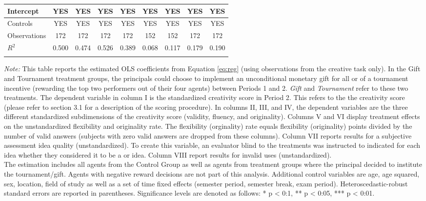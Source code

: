 \begin{landscape}
\begin{table}[h]
\begin{center}
{\begin{tabular}{lcccccccc}
\hline
 Intercept & YES & YES & YES & YES & YES & YES & YES & YES \\
\hline
 Controls & YES & YES & YES & YES & YES & YES & YES & YES \\
\hline
Observations        &         172   &         172   &         172   &         172   &         152   &         152   &         172   &         172   \\
$R^2$               &       0.500   &       0.474   &       0.526   &       0.389   &       0.068   &       0.117   &       0.179   &       0.190   \\
\hline\hline\noalign{\medskip}
\end{tabular}}
\begin{minipage}{\textwidth}
\footnotesize {\it Note:} This table reports the estimated OLS coefficients from Equation \ref{eq:reg} (using observations from the creative task only). 
In the Gift and Tournament treatment groups, the principals could choose to implement an unconditional monetary gift for all or of a tournament incentive (rewarding the top two performers out of their four agents) between Periods 1 and 2. 
\textit{Gift} and \textit{Tournament} refer to these two treatments. 
The dependent variable in column I is the standardized creativity score in Period 2. 
This refers to the the creativity score (please refer to section 3.1 for a description of the scoring procedure). 
In columns II, III, and IV, the dependent variables are the three different standardized subdimensions of the creativity score (validity, fluency, and originality). 
Columns V and VI display treatment effects on the unstandardized flexibility and originality rate. 
The flexibility (orginality) rate equals flexibility (originality) points divided by the number of valid answers (subjects with zero valid answers are dropped from these columns). 
Column VII reports results for a subjective assessment idea quality (unstandardized). To create this variable, an evaluator blind to the treatments was instructed to indicated for each idea whether they considered it to be a  or  idea. 
Column VIII report results for invalid uses (unstandardized). \\
The estimation includes all agents from the Control Group as well as agents from treatment groups where the principal decided to institute the tournament/gift. Agents with negative reward decisions are not part of this analysis. 
Additional control variables are age, age squared, sex, location, field of study as well as a set of time fixed effects (semester period, semester break, exam period). 
Heteroscedastic-robust standard errors are reported in parentheses. Significance levels are denoted as follows: * p < 0:1, ** p < 0:05, *** p < 0:01. 
\end{minipage}
\end{center}
\end{table}
\end{landscape}
